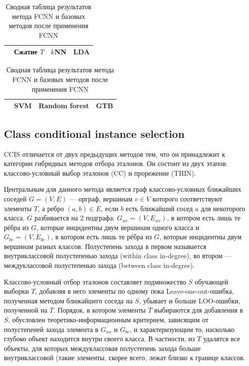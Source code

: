 \begin{table}[h!]
    \centering
    \begin{tabular}{|c||c||c|c|}
    \cline{2-4}
    \multicolumn{1}{c||}{} & Сжатие \(T\) & \(k\)NN & LDA \\
    \hline \hline
	
\end{tabular}
\newline \vspace*{0.5cm} \newline
\begin{tabular}{|c||c|c|c|}
    \cline{2-4}
    \multicolumn{1}{c||}{} & SVM & Random forest & GTB \\
    \hline \hline
	
    \end{tabular}
    \caption{Сводная таблица результатов метода FCNN и базовых методов после применения FCNN}
    \label{table:fcnn-results}
\end{table}

\subsection{Class conditional instance selection}
CCIS \cite{marchiori} отличается от двух предыдущих методов тем, что он принадлежит к категории гибридных методов отбора эталонов. Он состоит из двух этапов: классово-условный выбор эталонов (CC) и прорежение (THIN).

Центральным для данного метода является граф классово-условных ближайших соседей \(G=(V,E)\) --- орграф, вершинам \(v\in V\) которого соответствуют элементы \(T\), а ребро \((a,b)\in E\), если \(b\) есть ближайший сосед \(a\) для некоторого класса. \(G\) разбивается на 2 подграфа: \(G_{wc}=(V,E_{wc})\), в котором есть лишь те рёбра из \(G\), которые инцидентны двум вершинам одного класса и \(G_{bc}=(V,E_{bc})\), в котором есть лишь те рёбра из \(G\), которые инцидентны двум вершинам разных классов. Полустепень захода в первом называется внутриклассовой полустепенью захода (within class in-degree), во втором --- междуклассовой полустепенью захода (between class in-degree).

Классово-условный отбор эталонов составляет подмножество \(S\) обучающей выборки \(T\), добавляя в него элементы по одному пока Leave-one-out-ошибка, полученная методом ближайшего соседа на \(S\), убывает и больше LOO-ошибки, полученной на \(T\). Порядок, в котором элементы \(T\) выбираются для добавления в \(S\), обусловлен теоретико-информационным критерием, зависящим от полустепеней захода элемента в \(G_{wc}\) и \(G_{bc}\), и характеризующим то, насколько глубоко объект находится внутри своего класса. В частности, из \(T\) удалятся все объекты, для которых междуклассовая полустепень захода больше внутриклассовой (такие элементы, скорее всего, лежат близко к границе классов.


